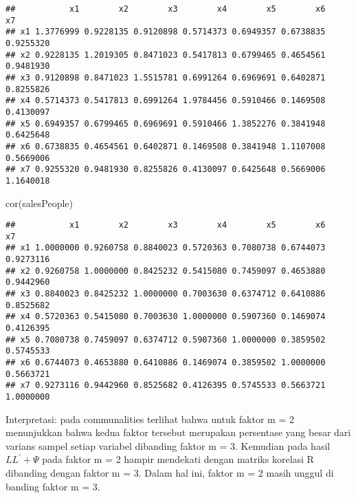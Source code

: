 \documentclass[
]{article}
\newenvironment{Shaded}{\begin{snugshade}}{\end{snugshade}}
\newcommand{\FunctionTok}[1]{\textcolor[rgb]{0.00,0.00,0.00}{#1}}
\newcommand{\NormalTok}[1]{#1}
\newcommand{\SpecialCharTok}[1]{\textcolor[rgb]{0.00,0.00,0.00}{#1}}
\begin{document}
\begin{Shaded}
\end{Shaded}

\begin{verbatim}
##           x1        x2        x3        x4        x5        x6        x7
## x1 1.3776999 0.9228135 0.9120898 0.5714373 0.6949357 0.6738835 0.9255320
## x2 0.9228135 1.2019305 0.8471023 0.5417813 0.6799465 0.4654561 0.9481930
## x3 0.9120898 0.8471023 1.5515781 0.6991264 0.6969691 0.6402871 0.8255826
## x4 0.5714373 0.5417813 0.6991264 1.9784456 0.5910466 0.1469508 0.4130097
## x5 0.6949357 0.6799465 0.6969691 0.5910466 1.3852276 0.3841948 0.6425648
## x6 0.6738835 0.4654561 0.6402871 0.1469508 0.3841948 1.1107008 0.5669006
## x7 0.9255320 0.9481930 0.8255826 0.4130097 0.6425648 0.5669006 1.1640018
\end{verbatim}

\begin{Shaded}
\begin{Highlighting}[]
\FunctionTok{cor}\NormalTok{(salesPeople)}
\end{Highlighting}
\end{Shaded}

\begin{verbatim}
##           x1        x2        x3        x4        x5        x6        x7
## x1 1.0000000 0.9260758 0.8840023 0.5720363 0.7080738 0.6744073 0.9273116
## x2 0.9260758 1.0000000 0.8425232 0.5415080 0.7459097 0.4653880 0.9442960
## x3 0.8840023 0.8425232 1.0000000 0.7003630 0.6374712 0.6410886 0.8525682
## x4 0.5720363 0.5415080 0.7003630 1.0000000 0.5907360 0.1469074 0.4126395
## x5 0.7080738 0.7459097 0.6374712 0.5907360 1.0000000 0.3859502 0.5745533
## x6 0.6744073 0.4653880 0.6410886 0.1469074 0.3859502 1.0000000 0.5663721
## x7 0.9273116 0.9442960 0.8525682 0.4126395 0.5745533 0.5663721 1.0000000
\end{verbatim}

Interpretasi: pada communalities terlihat bahwa untuk faktor m = 2
menunjukkan bahwa kedua faktor tersebut merupakan persentase yang besar
dari varians sampel setiap variabel dibanding faktor m = 3. Kemudian
pada hasil \(LL^{'} + \Psi\) pada faktor m = 2 hampir mendekati dengan
matriks korelasi R dibanding dengan faktor m = 3. Dalam hal ini, faktor
m = 2 masih unggul di banding faktor m = 3.
\end{document}
